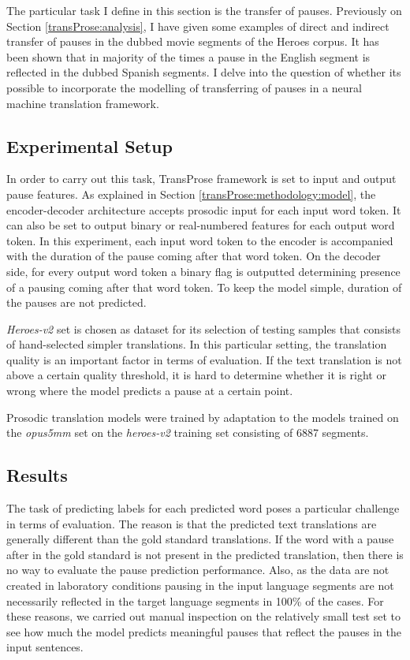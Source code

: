The particular task I define in this section is the transfer of pauses. Previously on Section \ref{transProse:analysis}, I have given some examples of direct and indirect transfer of pauses in the dubbed movie segments of the Heroes corpus. It has been shown that in majority of the times a pause in the English segment is reflected in the dubbed Spanish segments. I delve into the question of whether its possible to incorporate the modelling of transferring of pauses in a neural machine translation framework. 

\subsection*{Experimental Setup}

In order to carry out this task, TransProse framework is set to input and output pause features. As explained in Section \ref{transProse:methodology:model}, the encoder-decoder architecture accepts prosodic input for each input word token. It can also be set to output binary or real-numbered features for each output word token. In this experiment, each input word token to the encoder is accompanied with the duration of the pause coming after that word token. On the decoder side, for every output word token a binary flag is outputted determining presence of a pausing coming after that word token. To keep the model simple, duration of the pauses are not predicted.

\textit{Heroes-v2} set is chosen as dataset for its selection of testing samples that consists of hand-selected simpler translations. In this particular setting, the translation quality is an important factor in terms of evaluation. If the text translation is not above a certain quality threshold, it is hard to determine whether it is right or wrong where the model predicts a pause at a certain point. 

Prosodic translation models were trained by adaptation to the models trained on the \textit{opus5mm} set on the \textit{heroes-v2} training set consisting of 6887 segments. 

\subsection*{Results}
The task of predicting labels for each predicted word poses a particular challenge in terms of evaluation. The reason is that the predicted text translations are generally different than the gold standard translations. If the word with a pause after in the gold standard is not present in the predicted translation, then there is no way to evaluate the pause prediction performance. Also, as the data are not created in laboratory conditions pausing in the input language segments are not necessarily reflected in the target language segments in 100\% of the cases. For these reasons, we carried out manual inspection on the relatively small test set to see how much the model predicts meaningful pauses that reflect the pauses in the input sentences. 

